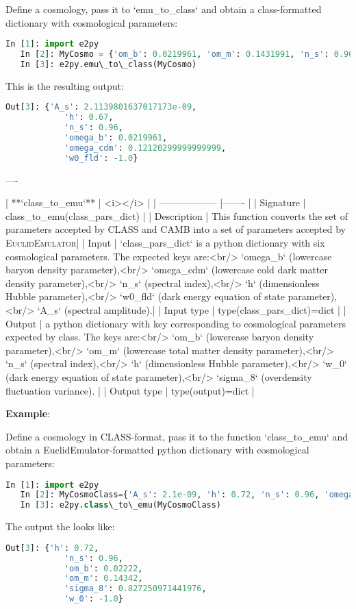\documentclass[american,11pt]{article}
\begin{document}
Define a cosmology, pass it to `emu\_to\_class` and obtain a class-formatted dictionary with cosmological parameters:

\begin{lstlisting}[language=python]
   In [1]: import e2py
   In [2]: MyCosmo = {'om_b': 0.0219961, 'om_m': 0.1431991, 'n_s': 0.96, 'h': 0.67, 'w_0': -1.0, 'sigma_8': 0.83}
   In [3]: e2py.emu\_to\_class(MyCosmo)
\end{lstlisting}
This is the resulting output:
\begin{lstlisting}[language=python]
   Out[3]: {'A_s': 2.1139801637017173e-09,
            'h': 0.67,
            'n_s': 0.96,
            'omega_b': 0.0219961,
            'omega_cdm': 0.12120299999999999,
            'w0_fld': -1.0}
\end{lstlisting}
----

| **`class\_to\_emu`** | <i></i> |
| ------------------ |-------  |
| Signature | class\_to\_emu(class\_pars\_dict) |
| Description | This function converts the set of parameters accepted by CLASS and CAMB into a set of parameters accepted by \textsc{EuclidEmulator}|
| Input | `class\_pars\_dict` is a python dictionary with six cosmological parameters. The expected keys are:<br/> `omega\_b` (lowercase baryon density parameter),<br/> `omega\_cdm` (lowercase cold dark matter density parameter),<br/> `n\_s` (spectral index),<br/> `h` (dimensionless Hubble parameter),<br/> `w0\_fld` (dark energy equation of state parameter),<br/> `A\_s` (spectral amplitude).|
| Input type | type(class\_pars\_dict)=dict |
| Output | a python dictionary with key corresponding to cosmological parameters expected by class. The keys are:<br/> `om\_b` (lowercase baryon density parameter),<br/> `om\_m` (lowercase total matter density parameter),<br/> `n\_s` (spectral index),<br/> `h` (dimensionless Hubble parameter),<br/> `w\_0` (dark energy equation of state parameter),<br/> `sigma\_8` (overdensity fluctuation variance). |
| Output type | type(output)=dict |

\textbf{Example}:

Define a cosmology in CLASS-format, pass it to the function `class\_to\_emu` and obtain a EuclidEmulator-formatted python dictionary with cosmological parameters:

\begin{lstlisting}[language=python]
   In [1]: import e2py
   In [2]: MyCosmoClass={'A_s': 2.1e-09, 'h': 0.72, 'n_s': 0.96, 'omega_b': 0.02222, 'omega_cdm': 0.1212, 'w0_fld': -1.0}
   In [3]: e2py.class\_to\_emu(MyCosmoClass) 
\end{lstlisting}
The output the looks like:
\begin{lstlisting}[language=python]
   Out[3]: {'h': 0.72,
            'n_s': 0.96,
            'om_b': 0.02222,
            'om_m': 0.14342,
            'sigma_8': 0.827250971441976,
            'w_0': -1.0}
\end{lstlisting}
\end{document}
